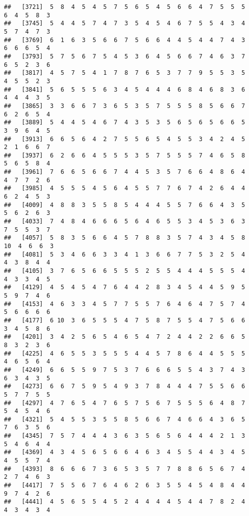 \documentclass[
]{book}
\begin{document}
\begin{verbatim}
##   [3721]  5  8  4  5  4  5  7  5  6  5  4  5  6  6  4  7  5  5  5  6  4  5  8  3
##   [3745]  5  4  4  5  7  4  7  3  5  4  5  4  6  7  5  5  4  3  4  5  7  4  7  3
##   [3769]  6  1  6  3  5  6  6  7  5  6  6  4  4  5  4  4  7  4  3  6  6  6  5  4
##   [3793]  5  7  5  6  7  5  4  5  3  6  4  5  6  6  7  4  6  3  7  6  5  2  3  6
##   [3817]  4  5  7  5  4  1  7  8  7  6  5  3  7  7  9  5  5  3  5  4  5  5  2  3
##   [3841]  5  6  5  5  5  6  3  4  5  4  4  4  6  8  4  6  8  3  6  4  4  4  3  5
##   [3865]  3  3  6  6  7  3  6  5  3  5  7  5  5  5  8  5  6  6  7  6  2  6  5  4
##   [3889]  5  4  4  5  4  6  7  4  3  5  3  5  6  5  6  5  6  6  5  3  9  6  4  5
##   [3913]  6  6  5  6  4  2  7  5  5  6  5  4  5  5  3  4  2  4  5  2  1  6  6  7
##   [3937]  6  2  6  6  4  5  5  5  3  5  7  5  5  5  7  4  6  5  8  5  6  5  8  4
##   [3961]  7  6  6  5  6  6  7  4  4  5  3  5  7  6  6  4  8  6  4  4  7  7  2  6
##   [3985]  4  5  5  5  4  5  6  4  5  5  7  7  6  7  4  2  6  4  4  6  2  4  5  3
##   [4009]  4  8  8  3  5  5  8  5  4  4  4  5  5  7  6  6  4  3  5  5  6  2  6  3
##   [4033]  7  4  8  4  6  6  6  5  6  4  6  5  5  3  4  5  3  6  3  7  5  5  3  7
##   [4057]  5  8  3  5  6  6  4  5  7  8  8  3  5  7  4  3  4  5  8 10  4  6  6  3
##   [4081]  5  3  4  6  6  3  3  4  1  3  6  6  7  7  5  3  2  5  4  4  3  8  4  4
##   [4105]  3  7  6  5  6  6  5  5  5  2  5  5  4  4  4  5  5  5  4  4  3  3  4  5
##   [4129]  4  5  4  5  4  7  6  4  4  2  8  3  4  5  4  4  5  9  5  5  9  7  4  6
##   [4153]  4  6  3  3  4  5  7  7  5  5  7  6  4  6  4  7  5  7  4  5  6  6  6  6
##   [4177]  6 10  3  6  5  5  5  4  7  5  8  7  5  5  4  7  5  6  6  3  4  5  8  6
##   [4201]  3  4  2  5  6  5  4  6  5  4  7  2  4  4  2  2  6  6  5  8  3  2  3  6
##   [4225]  4  6  5  5  3  5  5  5  4  4  5  7  8  6  4  4  5  5  5  4  6  5  6  4
##   [4249]  6  6  5  5  9  7  5  3  7  6  6  6  5  5  4  3  7  4  3  6  3  4  3  5
##   [4273]  6  6  7  5  9  5  4  9  3  7  8  4  4  4  7  5  5  6  6  5  7  7  5  5
##   [4297]  4  7  6  5  4  7  6  5  7  5  6  7  5  5  5  6  4  8  7  5  4  5  4  6
##   [4321]  5  4  5  5  3  5  5  8  5  6  6  7  4  6  6  4  3  6  5  7  6  3  5  6
##   [4345]  7  5  7  4  4  4  3  6  3  5  6  5  6  4  4  4  2  1  3  5  4  6  4  4
##   [4369]  4  3  4  5  6  5  6  6  4  6  3  4  5  5  4  4  3  4  5  4  5  5  7  4
##   [4393]  8  6  6  6  7  3  6  5  3  5  7  7  8  8  6  5  6  7  4  2  7  4  6  3
##   [4417]  7  5  5  6  7  6  4  6  2  6  3  5  5  4  5  4  8  4  4  9  7  4  2  6
##   [4441]  4  5  6  5  5  4  5  2  4  4  4  4  5  4  4  7  8  2  4  4  3  4  3  4

\end{verbatim}
\end{document}
